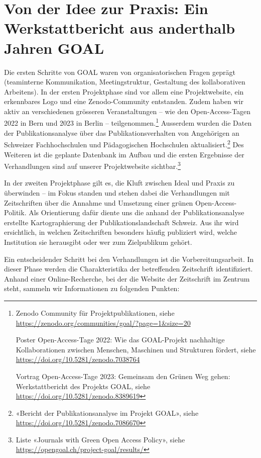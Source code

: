 \documentclass[a4paper,
fontsize=11pt,
oneside,
numbers=noperiodatend,
parskip=half-,
bibliography=totoc,
final
]{scrartcl}
\begin{document}
\hypertarget{von-der-idee-zur-praxis-ein-werkstattbericht-aus-anderthalb-jahren-goal}{%
\section{Von der Idee zur Praxis: Ein Werkstattbericht aus
anderthalb Jahren
GOAL}\label{von-der-idee-zur-praxis-ein-werkstattbericht-aus-anderthalb-jahren-goal}}

Die ersten Schritte von GOAL waren von organisatorischen Fragen geprägt
(teaminterne Kommunikation, Meetingstruktur, Gestaltung des
kollaborativen Arbeitens). In der ersten Projektphase sind vor allem
eine Projektwebsite, ein erkennbares Logo und eine Zenodo-Community
entstanden. Zudem haben wir aktiv an verschiedenen grösseren
Veranstaltungen -- wie den Open-Access-Tagen 2022 in Bern und 2023 in
Berlin -- teilgenommen.\footnote{Zenodo Community für
  Projektpublikationen, siehe
  \url{https://zenodo.org/communities/goal/?page=1\&size=20}

  Poster Open-Access-Tage 2022: Wie das GOAL-Projekt nachhaltige
  Kollaborationen zwischen Menschen, Maschinen und Strukturen fördert,
  siehe \url{https://doi.org/10.5281/zenodo.7038764}

  Vortrag Open-Access-Tage 2023: Gemeinsam den Grünen Weg gehen:
  Werkstattbericht des Projekts GOAL, siehe
  \url{https://doi.org/10.5281/zenodo.8389619}} Ausserdem wurden die
Daten der Publikationsanalyse über das Publikationsverhalten von
Angehörigen an Schweizer Fachhochschulen und Pädagogischen Hochschulen
aktualisiert.\footnote{«Bericht der Publikationsanalyse im Projekt
  GOAL», siehe \url{https://doi.org/10.5281/zenodo.7086670}} Des
Weiteren ist die geplante Datenbank im Aufbau und die ersten Ergebnisse
der Verhandlungen sind auf unserer Projektwebsite sichtbar.\footnote{Liste
  «Journals with Green Open Access Policy», siehe
  \url{https://opengoal.ch/project-goal/results/}}

In der zweiten Projektphase gilt es, die Kluft zwischen Ideal und Praxis
zu überwinden -- im Fokus standen und stehen dabei die Verhandlungen mit
Zeitschriften über die Annahme und Umsetzung einer grünen
Open-Access-Politik. Als Orientierung dafür diente uns die anhand der
Publikationsanalyse erstellte Kartographierung der
Publikationslandschaft Schweiz. Aus ihr wird ersichtlich, in welchen
Zeitschriften besonders häufig publiziert wird, welche Institution sie
herausgibt oder wer zum Zielpublikum gehört.

Ein entscheidender Schritt bei den Verhandlungen ist die
Vorbereitungsarbeit. In dieser Phase werden die Charakteristika der
betreffenden Zeitschrift identifiziert. Anhand einer Online-Recherche,
bei der die Website der Zeitschrift im Zentrum steht, sammeln wir
Informationen zu folgenden Punkten:
\end{document}
